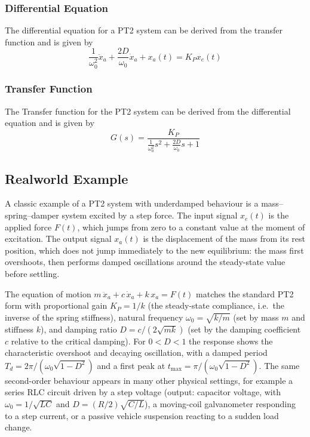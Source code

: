 \documentclass[12pt, oneside, a4paper]{scrreprt}
\begin{document}
                \subsubsection{Differential Equation}
                    The differential equation for a PT2 system can be derived from the transfer function and is given by
                    \begin{equation}
                        \frac{1}{\omega_0^2} \ddot{x}_a + \frac{2D}{\omega_0} \dot{x}_a + x_a(t) = K_P x_e(t)
                    \end{equation}

                \subsubsection{Transfer Function}
                    The Transfer function for the PT2 system can be derived from the differential equation and is given by
                    \begin{equation}
                        G(s) = \frac{K_P}{\frac{1}{\omega_0^2} s^2 + \frac{2D}{\omega_0} s + 1}
                    \end{equation}

            \subsection{Realworld Example}

                A classic example of a PT2 system with underdamped behaviour is a mass--spring--damper system excited by a step force. The input signal $x_e(t)$ is the applied force $F(t)$, which jumps from zero to a constant value at the moment of excitation. The output signal $x_a(t)$ is the displacement of the mass from its rest position, which does not jump immediately to the new equilibrium: the mass first overshoots, then performs damped oscillations around the steady-state value before settling.

                The equation of motion $m\,\ddot{x}_a + c\,\dot{x}_a + k\,x_a = F(t)$ matches the standard PT2 form with proportional gain $K_P = 1/k$ (the steady-state compliance, i.e.\ the inverse of the spring stiffness), natural frequency $\omega_0 = \sqrt{k/m}$ (set by mass $m$ and stiffness $k$), and damping ratio $D = c/(2\sqrt{mk})$ (set by the damping coefficient $c$ relative to the critical damping). For $0 < D < 1$ the response shows the characteristic overshoot and decaying oscillation, with a damped period $T_d = 2\pi/(\omega_0\sqrt{1 - D^2})$ and a first peak at $t_\mathrm{max} = \pi/(\omega_0\sqrt{1 - D^2})$. The same second-order behaviour appears in many other physical settings, for example a series RLC circuit driven by a step voltage (output: capacitor voltage, with $\omega_0 = 1/\sqrt{LC}$ and $D = (R/2)\sqrt{C/L}$), a moving-coil galvanometer responding to a step current, or a passive vehicle suspension reacting to a sudden load change.
\end{document}
